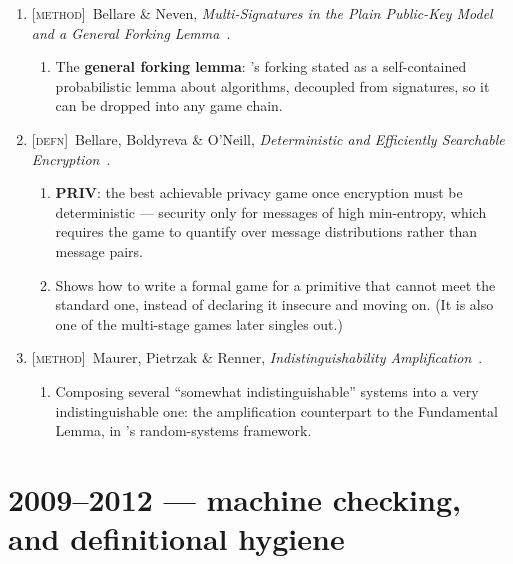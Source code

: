 \documentclass[11pt]{article}
\newcommand{\kind}[1]{{\footnotesize\textsc{\textcolor{yearcolor}{[#1]}}}\ }
\newcommand{\defn}{\kind{defn}}
\newcommand{\method}{\kind{method}}
\newcommand{\paper}[3]{#1, \emph{#2}~\cite{#3}.}
\begin{document}
\begin{enumerate}
  \item \method \paper{Bellare \& Neven}{Multi-Signatures in the Plain
    Public-Key Model and a General Forking Lemma}{BN06}
    \begin{enumerate}
      \item The \textbf{general forking lemma}: \cite{PS96}'s forking stated as
        a self-contained probabilistic lemma about algorithms, decoupled from
        signatures, so it can be dropped into any game chain.
    \end{enumerate}

  \item \defn \paper{Bellare, Boldyreva \& O'Neill}{Deterministic and
    Efficiently Searchable Encryption}{BBO07}
    \begin{enumerate}
      \item \textbf{PRIV}: the best achievable privacy game once encryption must
        be deterministic --- security only for messages of high min-entropy,
        which requires the game to quantify over message distributions rather
        than message pairs.
      \item Shows how to write a formal game for a primitive that cannot meet
        the standard one, instead of declaring it insecure and moving on. (It
        is also one of the multi-stage games \cite{RSS11} later singles out.)
    \end{enumerate}

  \item \method \paper{Maurer, Pietrzak \& Renner}{Indistinguishability
    Amplification}{MPR07}
    \begin{enumerate}
      \item Composing several ``somewhat indistinguishable'' systems into a very
        indistinguishable one: the amplification counterpart to the Fundamental
        Lemma, in \cite{Mau02}'s random-systems framework.
    \end{enumerate}
\end{enumerate}

\section{2009--2012 --- machine checking, and definitional hygiene}
\end{document}

